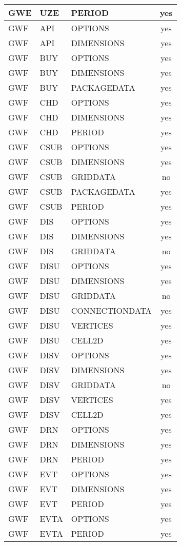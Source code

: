 \begin{longtable}{p{1.5cm} p{1.5cm} p{3cm} c}
GWE & UZE & PERIOD & yes \\ 
\hline
GWF & API & OPTIONS & yes \\ 
GWF & API & DIMENSIONS & yes \\ 
\hline
GWF & BUY & OPTIONS & yes \\ 
GWF & BUY & DIMENSIONS & yes \\ 
GWF & BUY & PACKAGEDATA & yes \\ 
\hline
GWF & CHD & OPTIONS & yes \\ 
GWF & CHD & DIMENSIONS & yes \\ 
GWF & CHD & PERIOD & yes \\ 
\hline
GWF & CSUB & OPTIONS & yes \\ 
GWF & CSUB & DIMENSIONS & yes \\ 
GWF & CSUB & GRIDDATA & no \\ 
GWF & CSUB & PACKAGEDATA & yes \\ 
GWF & CSUB & PERIOD & yes \\ 
\hline
GWF & DIS & OPTIONS & yes \\ 
GWF & DIS & DIMENSIONS & yes \\ 
GWF & DIS & GRIDDATA & no \\ 
\hline
GWF & DISU & OPTIONS & yes \\ 
GWF & DISU & DIMENSIONS & yes \\ 
GWF & DISU & GRIDDATA & no \\ 
GWF & DISU & CONNECTIONDATA & yes \\ 
GWF & DISU & VERTICES & yes \\ 
GWF & DISU & CELL2D & yes \\ 
\hline
GWF & DISV & OPTIONS & yes \\ 
GWF & DISV & DIMENSIONS & yes \\ 
GWF & DISV & GRIDDATA & no \\ 
GWF & DISV & VERTICES & yes \\ 
GWF & DISV & CELL2D & yes \\ 
\hline
GWF & DRN & OPTIONS & yes \\ 
GWF & DRN & DIMENSIONS & yes \\ 
GWF & DRN & PERIOD & yes \\ 
\hline
GWF & EVT & OPTIONS & yes \\ 
GWF & EVT & DIMENSIONS & yes \\ 
GWF & EVT & PERIOD & yes \\ 
\hline
GWF & EVTA & OPTIONS & yes \\ 
GWF & EVTA & PERIOD & yes \\ 

\end{longtable}
